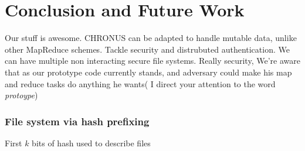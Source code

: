 \documentclass[conference, compsocconf, letterpaper]{IEEEtran}
\begin{document}
\section{Conclusion and Future Work}
Our stuff \cite{code} is awesome.
CHRONUS can be adapted to handle mutable data, unlike other MapReduce schemes.
Tackle security and distrubuted authentication.
We can have multiple non interacting secure file systems.
Really security,  We're aware that as our prototype code currently stands, and adversary could make his map and reduce tasks do anything he wants(   I direct your attention to the word \emph{protoype})


\subsubsection{File system via hash prefixing}
First $k$ bits of hash used to describe files




\end{document}
